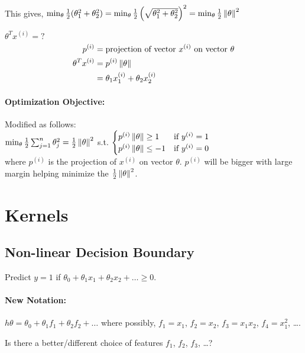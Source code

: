 This gives, $\min_\theta \frac{1}{2}(\theta_1^2 + \theta_2^2)
	= \min_\theta\frac{1}{2}\left(\sqrt{\theta_1^2 + \theta_2^2}\right)^2
	= \min_\theta\frac{1}{2}\left\Vert \theta \right\Vert^2$

$\theta^Tx^{(i)} = ?$
\begin{align*}
	p^{(i)}         & = \text{projection of vector } x^{(i)} \text{ on vector } \theta \\
	\theta^Tx^{(i)} & = p^{(i)}\left\Vert \theta \right\Vert                                           \\
	                & = \theta_1x_1^{(i)} + \theta_2x_2^{(i)}                          \\
\end{align*}

\paragraph{Optimization Objective:} Modified as follows:\\
$\min_\theta \frac{1}{2}\sum_{j=1}^n\theta^2_j = \frac{1}{2}\left\Vert \theta \right\Vert^2$ s.t. $\begin{cases}
		p^{(i)}\left\Vert \theta \right\Vert \ge 1  & \text{if } y^{(i)} = 1 \\
		p^{(i)}\left\Vert \theta \right\Vert \le -1 & \text{if } y^{(i)} = 0 \\
	\end{cases}$\\
where $p^{(i)}$ is the projection of $x^{(i)}$ on vector $\theta$. $p^{(i)}$ will be
bigger with large margin helping minimize the $\frac{1}{2}\left\Vert \theta \right\Vert^2$.

\section{Kernels}
\subsection{Non-linear Decision Boundary}
Predict $y = 1$ if $\theta_0 + \theta_1x_1 + \theta_2x_2 + \dots \ge 0$.

\paragraph{New Notation:} $h\theta = \theta_0 + \theta_1f_1 + \theta_2f_2 + \dots$
where possibly, $f_1 = x_1$, $f_2 = x_2$, $f_3 = x_1x_2$, $f_4 = x_1^2$, \dots.

Is there a better/different choice of features $f_1$, $f_2$, $f_3$, \dots?

